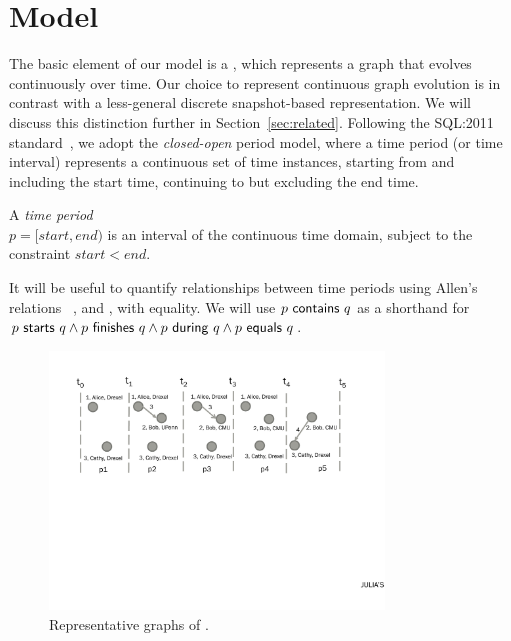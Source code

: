 \section{Model}
\label{sec:model}

The basic element of our model is a \tg, which represents a graph that
evolves continuously over time.  Our choice to represent continuous
graph evolution is in contrast with a less-general discrete
snapshot-based representation.  We will discuss this distinction
further in Section~\ref{sec:related}.  Following the SQL:2011
standard~\cite{DBLP:journals/sigmod/KulkarniM12}, we adopt the {\em
  closed-open} period model, where a time period (or time interval)
represents a continuous set of time instances, starting from and
including the start time, continuing to but excluding the end time.

\begin{definition}
A {\em time period} \\$p = [start, end)$ is an interval of the
  continuous time domain, subject to the constraint $start < end$.
\label{def:period} 
\end{definition}

It will be useful to quantify relationships between time periods
using Allen's relations~\cite{allen83} ,
 and , with equality.  We will
use $p~\mathsf{contains}~q$ as a shorthand for $p~\mathsf{starts}~q
\wedge p~\mathsf{finishes}~q \wedge p~\mathsf{during}~q \wedge
p~\mathsf{equals}~q$.

\begin{figure}
\centering
\includegraphics[width=3.5in]{figs/T1_graphs.pdf}
\caption{Representative graphs of \tg {}.}
\label{fig:tg_rg}
\end{figure}


